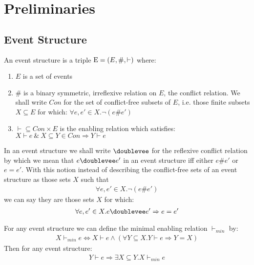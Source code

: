 \section{Preliminaries}
\subsection{Event Structure \cite{es}}
\begin{definition}
    An event structure is a triple $\mathrm{E} = (E,\#,\vdash)$ where:
    \begin{enumerate}
        \item $E$ is a set of events
        \item \# is a binary symmetric, irreflexive relation on $E$,
              the conflict relation.
              We shall write $Con$ for the set of conflict-free subsets of $E$,
              i.e. those finite subsets $X \subseteq E$ for which:
              $\forall e,e' \in X . \neg (e\#e')$
        \item $\vdash \subseteq Con \times E$ is the enabling relation which satisfies:
              $ X \vdash e \ \& \ X \subseteq Y \in Con \Rightarrow Y \vdash e$
    \end{enumerate}

\end{definition}
\begin{notion}
    In an event structure we shall write $\doublevee$ for the reflexive conflict relation by which we mean
    that $e\doublevee e'$ in an event structure iff either $e\#e'$ or $e=e'$.
    With this notion instead of describing the conflict-free sets of an event structure
    as those sets $X$ such that
    \begin{align*}
        \forall e,e' \in X. \neg(e\#e')
    \end{align*}
    we can say they are those sets $X$ for which:
    \begin{align*}
        \forall e,e' \in X. e\doublevee e' \Rightarrow e=e'
    \end{align*}
\end{notion}

\begin{notion}
    For any event structure we can define the minimal enabling relation $\vdash_{min}$ by:
    \begin{align*}
        X \vdash_{min} e \iff X \vdash e \wedge
        ( \forall Y \subseteq X . Y \vdash e \Rightarrow Y = X )
    \end{align*}
    Then for any event structure:
    \begin{align*}
        Y \vdash e \Rightarrow \exists X \subseteq Y . X \vdash_{min} e
    \end{align*}
\end{notion}

